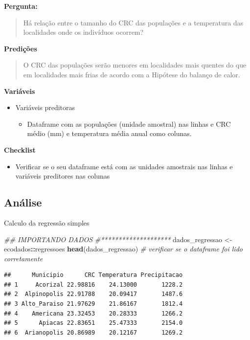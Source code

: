 \documentclass[
]{book}
\newenvironment{Shaded}{\begin{snugshade}}{\end{snugshade}}
\newcommand{\CommentTok}[1]{\textcolor[rgb]{0.56,0.35,0.01}{\textit{#1}}}
\newcommand{\KeywordTok}[1]{\textcolor[rgb]{0.13,0.29,0.53}{\textbf{#1}}}
\newcommand{\NormalTok}[1]{#1}
\newcommand{\OperatorTok}[1]{\textcolor[rgb]{0.81,0.36,0.00}{\textbf{#1}}}
\newcommand{\StringTok}[1]{\textcolor[rgb]{0.31,0.60,0.02}{#1}}
\providecommand{\tightlist}{%
  \setlength{\itemsep}{0pt}\setlength{\parskip}{0pt}}
\begin{document}
\textbf{Pergunta:}

\begin{quote}
Há relação entre o tamanho do CRC das populações e a temperatura das localidades onde os indivíduos ocorrem?
\end{quote}

\textbf{Predições}

\begin{quote}
O CRC das populações serão menores em localidades mais quentes do que em localidades mais frias de acordo com a Hipótese do balanço de calor.
\end{quote}

\textbf{Variáveis}

\begin{itemize}
\tightlist
\item
  Variáveis preditoras

  \begin{itemize}
  \tightlist
  \item
    Dataframe com as populações (unidade amostral) nas linhas e CRC médio (mm) e temperatura média anual como colunas.
  \end{itemize}
\end{itemize}

\textbf{Checklist}

\begin{itemize}
\tightlist
\item
  Verificar se o seu dataframe está com as unidades amostrais nas linhas e variáveis preditores nas colunas
\end{itemize}

\hypertarget{anuxe1lise-4}{%
\subsection{Análise}\label{anuxe1lise-4}}

Calculo da regressão simples

\begin{Shaded}
\begin{Highlighting}[]
\CommentTok{## IMPORTANDO DADOS}
\CommentTok{#********************}
\NormalTok{dados_regressao <-}\StringTok{ }\NormalTok{ecodados}\OperatorTok{::}\NormalTok{regressoes}
\KeywordTok{head}\NormalTok{(dados_regressao) }\CommentTok{# verificar se o dataframe foi lido corretamente}
\end{Highlighting}
\end{Shaded}

\begin{verbatim}
##      Municipio      CRC Temperatura Precipitacao
## 1     Acorizal 22.98816    24.13000       1228.2
## 2  Alpinopolis 22.91788    20.09417       1487.6
## 3 Alto_Paraiso 21.97629    21.86167       1812.4
## 4    Americana 23.32453    20.28333       1266.2
## 5      Apiacas 22.83651    25.47333       2154.0
## 6  Arianopolis 20.86989    20.12167       1269.2
\end{verbatim}
\end{document}
